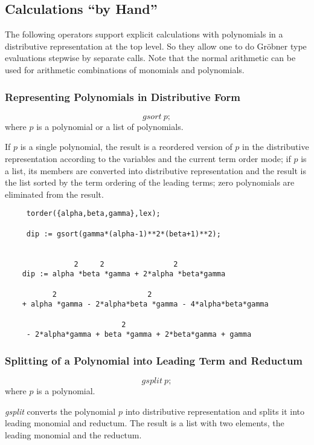 \subsection{Calculations ``by Hand''}
The following operators support explicit calculations with
polynomials in a distributive representation at the \REDUCE top level.
So they allow one to do Gr\"obner type evaluations stepwise by
separate calls. Note that the normal \REDUCE arithmetic can be used
for arithmetic combinations of monomials and polynomials.

\subsubsection{Representing Polynomials in Distributive Form}
\hypertarget{operator:GSORT}{}
\[ gsort \  p; \]
where $p$ is a polynomial or a list of polynomials.

If $p$ is a single polynomial, the result is a reordered version of $p$
in the distributive representation according to the variables and the
current term order mode; if $p$ is a list, its members are converted
into distributive representation and the result is the list sorted by
the term ordering of the leading terms; zero polynomials are
eliminated from the result.

\begin{verbatim}
     torder({alpha,beta,gamma},lex);

     dip := gsort(gamma*(alpha-1)**2*(beta+1)**2);


                2     2                2
    dip := alpha *beta *gamma + 2*alpha *beta*gamma

           2                     2
    + alpha *gamma - 2*alpha*beta *gamma - 4*alpha*beta*gamma

                           2
     - 2*alpha*gamma + beta *gamma + 2*beta*gamma + gamma
\end{verbatim}

\subsubsection{Splitting of a Polynomial into Leading Term and Reductum}
\hypertarget{operator:GSPLIT}{}
\[ gsplit \  p; \]
where $p$ is a polynomial.

\emph{gsplit} converts the polynomial $p$ into distributive representation
and splits it into leading monomial and reductum. The result is a list
with two elements, the leading monomial and the reductum.

